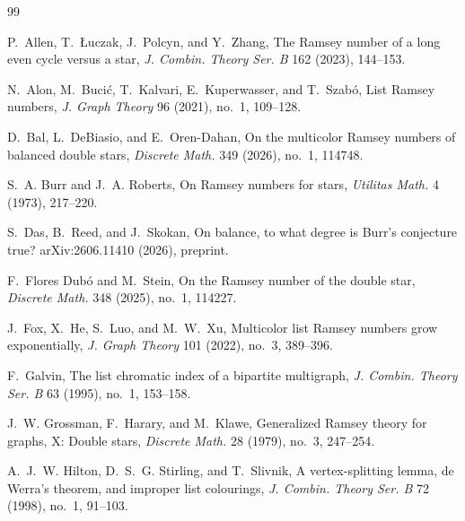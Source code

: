 \documentclass[11pt]{article}
\theoremstyle{definition}
\theoremstyle{remark}
\begin{document}
\begin{thebibliography}{99}
\setlength{\itemsep}{2pt}

P.~Allen, T.~{\L}uczak, J.~Polcyn, and Y.~Zhang,
\newblock The Ramsey number of a long even cycle versus a star,
\newblock \emph{J. Combin. Theory Ser. B} 162 (2023), 144--153.

\begingroup
N.~Alon, M.~Buci\'c, T.~Kalvari, E.~Kuperwasser, and T.~Szab\'o,
\newblock List Ramsey numbers,
\newblock \emph{J. Graph Theory} 96 (2021), no.~1, 109--128.
\endgroup

\begingroup
D.~Bal, L.~DeBiasio, and E.~Oren-Dahan,
\newblock On the multicolor Ramsey numbers of balanced double stars,
\newblock \emph{Discrete Math.} 349 (2026), no.~1, 114748.
\endgroup



S.~A. Burr and J.~A. Roberts,
\newblock On Ramsey numbers for stars,
\newblock \emph{Utilitas Math.} 4 (1973), 217--220.





\begingroup
S.~Das, B.~Reed, and J.~Skokan,
\newblock On balance, to what degree is Burr's conjecture true?
\newblock arXiv:2606.11410 (2026), preprint.
\endgroup



\begingroup
F.~Flores Dub\'o and M.~Stein,
\newblock On the Ramsey number of the double star,
\newblock \emph{Discrete Math.} 348 (2025), no.~1, 114227.
\endgroup


\begingroup
J.~Fox, X.~He, S.~Luo, and M.~W.~Xu,
\newblock Multicolor list Ramsey numbers grow exponentially,
\newblock \emph{J. Graph Theory} 101 (2022), no.~3, 389--396.
\endgroup

\begingroup
F.~Galvin,
\newblock The list chromatic index of a bipartite multigraph,
\newblock \emph{J. Combin. Theory Ser. B} 63 (1995), no.~1, 153--158.
\endgroup

\begingroup
J.~W. Grossman, F.~Harary, and M.~Klawe,
\newblock Generalized Ramsey theory for graphs, X: Double stars,
\newblock \emph{Discrete Math.} 28 (1979), no.~3, 247--254.
\endgroup

\begingroup
A.~J.~W. Hilton, D.~S.~G. Stirling, and T.~Slivnik,
\newblock A vertex-splitting lemma, de Werra's theorem, and improper
list colourings,
\newblock \emph{J. Combin. Theory Ser. B} 72 (1998), no.~1, 91--103.
\endgroup



\end{thebibliography}
\end{document}
